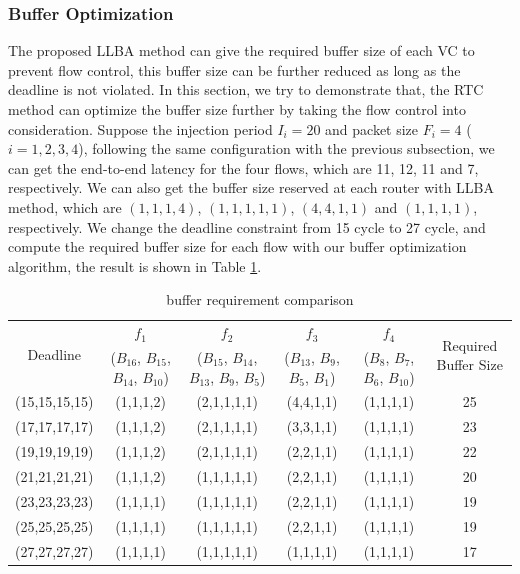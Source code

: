 \documentclass[10pt,journal]{IEEEtran}
\begin{document}
\subsubsection{Buffer Optimization}
The proposed LLBA method \cite{189} can give the required buffer size of each VC to prevent flow control, this buffer size can be further reduced as long as the deadline is not violated. In this section, we try to demonstrate that, the RTC method can optimize the buffer size further by taking the flow control into consideration. Suppose the injection period $I_i=20$ and packet size $F_i=4$ ($i=1,2,3,4$), following the same configuration with the previous subsection, we can get the end-to-end latency for the four flows, which are 11, 12, 11 and 7, respectively. We can also get the buffer size reserved at each router with LLBA method, which are $(1,1,1,4)$, $(1,1,1,1,1)$, $(4,4,1,1)$ and $(1,1,1,1)$, respectively. We change the deadline constraint from 15 cycle to 27 cycle, and compute the required buffer size for each flow with our buffer optimization algorithm, the result is shown in Table \ref{LLBAvsRTC}.
\begin{table}[htbp]
\centering
\caption{\label{LLBAvsRTC}buffer requirement comparison}
\begin{tabular}{|c|c|c|c|c|c|}
\hline
\multirow{2}{*}{Deadline}  & $f_1$  &   $f_2$   &   $f_3$   &   $f_4$   &   \multirow{2}{*}{Required Buffer Size} \\
($D_1$, $D_2$, $D_3$, $D_4$)    &   ($B_{16}$, $B_{15}$, $B_{14}$, $B_{10}$)  &   ($B_{15}$, $B_{14}$, $B_{13}$, $B_{9}$, $B_5$)  & ($B_{13}$, $B_{9}$, $B_{5}$, $B_{1}$)   &    ($B_{8}$, $B_{7}$, $B_{6}$, $B_{10}$)   &   \\
\hline
(15,15,15,15)   &   (1,1,1,2)   &   (2,1,1,1,1) &   (4,4,1,1)   &   (1,1,1,1)   &   25\\
\hline
(17,17,17,17)   &   (1,1,1,2)   &   (2,1,1,1,1) &   (3,3,1,1)   &   (1,1,1,1)   &   23\\
\hline
(19,19,19,19)   &   (1,1,1,2)   &   (2,1,1,1,1) &   (2,2,1,1)   &   (1,1,1,1)   &   22\\
\hline
(21,21,21,21)   &   (1,1,1,2)   &   (1,1,1,1,1) &   (2,2,1,1)   &   (1,1,1,1)   &   20\\
\hline
(23,23,23,23)   &   (1,1,1,1)   &   (1,1,1,1,1) &   (2,2,1,1)   &   (1,1,1,1)   &   19\\
\hline
(25,25,25,25)   &   (1,1,1,1)   &   (1,1,1,1,1) &   (2,2,1,1)   &   (1,1,1,1)   &   19\\
\hline
(27,27,27,27)   &   (1,1,1,1)   &   (1,1,1,1,1) &   (1,1,1,1)   &   (1,1,1,1)   &   17\\
\hline
\end{tabular}
\end{table}
\end{document}
